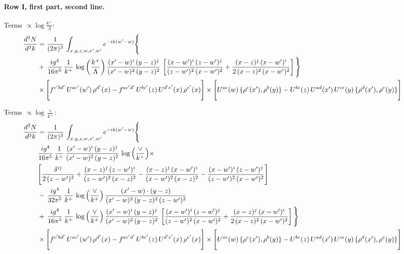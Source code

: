 \documentclass[10pt]{article}
\numberwithin{equation}{section}
\begin{document}
\paragraph{Row I, first part, second line.}
\noindent Terms $\propto\log\frac{k^+}{\Lambda}$:
\begin{align}
\frac{d^{3}N}{d^{3}k} & =  \frac{1}{(2\pi)^{3}}\,\int_{x,y,z,w,x',w^{\prime}} e^{-ik(w^{\prime}-w)}\Bigg\{\notag \\
& +\,\frac{ig^{4}}{16\pi^{5}}\,\frac{1}{k^{+}}\,\log{\left(\frac{k^{+}}{\Lambda}\right)}\,\frac{(x'-w)^{i}\,(y-z)^{j}}{(x'-w)^{2}\,(y-z)^{2}}\,\left[\frac{(x-w')^{i}\,(z-w')^{j}}{(z-w')^{2}\,(x-w')^{2}}+\frac{(x-z)^{j}\,(x-w')^{i}}{2\,(x-z)^{2}\, (x-w')^{2}}\right]\Bigg\} \notag \\ & \times\Bigg[f^{c'bd'}\,U^{ac'}(w')\,\rho^{d'}(x)-f^{ac'd'}\, U^{bc'}(z)\,U^{d'e'}(x)\,\rho^{e'}(x)\Bigg] \times \Bigg[U^{ac}(w)\,\{\rho^{c}(x'),\rho^{b}(y)\}-U^{bc}(z)\,U^{ad}(x')\,U^{ce}(y)\, \{\rho^{d}(x'),\rho^{e}(y)\}\Bigg] \label{eq:J:G2I1B}
\end{align}

\noindent Terms $\propto\log\frac{\vee}{k^+}$:
\begin{align}
\frac{d^{3}N}{d^{3}k} & =  \frac{1}{(2\pi)^{3}}\,\int_{x,y,z,w,x',w^{\prime}} e^{-ik(w^{\prime}-w)}\Bigg\{\notag \\
&  \frac{ig^{4}}{16\pi^{5}}\,\frac{1}{k^{+}}\, \frac{(x'-w)^{i}\,(y-z)^{j}}{(x'-w)^{2}\,(y-z)^{2}}\,\log{\left(\frac{\vee}{k^{+}}\right)}\times\notag \\ &  \Bigg[\frac{\delta^{ij}}{2\,(z-w')^{2}}+\frac{(x-z)^{j}\,(z-w')^{i}}{(z-w')^{2}\,(x-z)^{2}}-\frac{(x-z)^{j}\,(x-w')^{i}}{(x-w')^{2}\,(x-z)^{2}}-\frac{(x-w')^{i}\,(z-w')^{j}}{(z-w')^{2}\,(x-w')^{2}}\Bigg] \notag \\
& -\,\frac{ig^{4}}{32\pi^{5}}\,\frac{1}{k^{+}}\,\log{\left(\frac{\vee}{k^{+}}\right)}\, \frac{(x'-w)\cdot (y-z)}{(x'-w)^{2}\,(y-z)^{2}\,(z-w')^{2}} \notag \\
& +\,\frac{ig^{4}}{16\pi^{5}}\,\frac{1}{k^{+}}\,\log{\left(\frac{\vee}{k^{+}}\right)}\,\frac{(x'-w)^{i}\,(y-z)^{j}}{(x'-w)^{2}\,(y-z)^{2}}\,\left[\frac{(x-w')^{i}\,(z-w')^{j}}{(z-w')^{2}\,(x-w')^{2}}+\frac{(x-z)^{j}\,(x-w')^{i}}{2\,(x-z)^{2}\, (x-w')^{2}}\right]\Bigg\} \notag \\ & \times\Bigg[f^{c'bd'}\,U^{ac'}(w')\,\rho^{d'}(x)-f^{ac'd'}\, U^{bc'}(z)\,U^{d'e'}(x)\,\rho^{e'}(x)\Bigg] \times \Bigg[U^{ac}(w)\,\{\rho^{c}(x'),\rho^{b}(y)\}-U^{bc}(z)\,U^{ad}(x')\,U^{ce}(y)\, \{\rho^{d}(x'),\rho^{e}(y)\}\Bigg] \label{eq:B:G2I1B}
\end{align}
\end{document}
